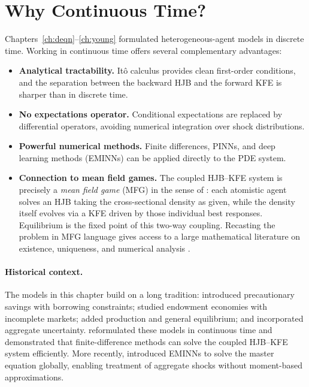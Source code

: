 \documentclass[11pt,a4paper]{report}
\begin{document}
\section{Why Continuous Time?}
\label{sec:ct_why}

Chapters~\ref{ch:deqn}--\ref{ch:young} formulated heterogeneous-agent models in discrete time.  Working in continuous time offers several complementary advantages:
\begin{itemize}[itemsep=2pt]
\item \textbf{Analytical tractability.}  It\^o calculus provides clean first-order conditions, and the separation between the backward HJB and the forward KFE is sharper than in discrete time.
\item \textbf{No expectations operator.}  Conditional expectations are replaced by differential operators, avoiding numerical integration over shock distributions.
\item \textbf{Powerful numerical methods.}  Finite differences, PINNs, and deep learning methods (EMINNs) can be applied directly to the PDE system.
\item \textbf{Connection to mean field games.}  The coupled HJB--KFE system is precisely a \emph{mean field game} (MFG) in the sense of \citet{lasry2007mean}: each atomistic agent solves an HJB taking the cross-sectional density as given, while the density itself evolves via a KFE driven by those individual best responses.  Equilibrium is the fixed point of this two-way coupling.  Recasting the problem in MFG language gives access to a large mathematical literature on existence, uniqueness, and numerical analysis \citep{carmona2018probabilistic, cardaliaguet2019master}.
\end{itemize}

\paragraph{Historical context.}  The models in this chapter build on a long tradition: \citet{bewley1986stationary} introduced precautionary savings with borrowing constraints; \citet{huggett1993riskfree} studied endowment economies with incomplete markets; \citet{Aiyagari} added production and general equilibrium; and \citet{krusell1998income} incorporated aggregate uncertainty.  \citet{achdou2022income} reformulated these models in continuous time and demonstrated that finite-difference methods can solve the coupled HJB--KFE system efficiently.  More recently, \citet{gu2024masterequations} introduced EMINNs to solve the master equation globally, enabling treatment of aggregate shocks without moment-based approximations.
\end{document}
